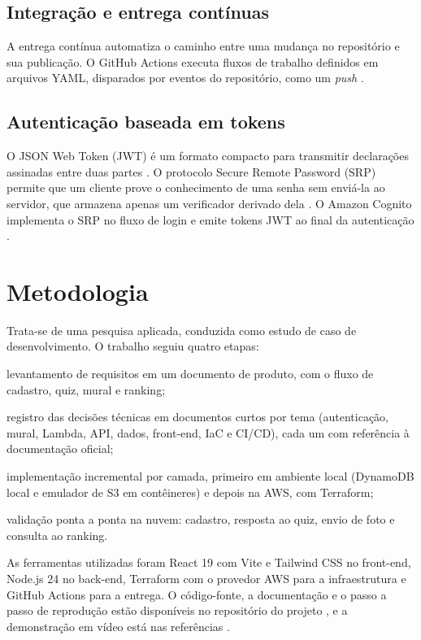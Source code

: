 \documentclass[article, 12pt, oneside, a4paper, english, brazil, sumario=tradicional]{abntex2}
\begin{document}
\subsection{Integração e entrega contínuas}

A entrega contínua automatiza o caminho entre uma mudança no repositório e sua publicação. O GitHub Actions executa fluxos de trabalho definidos em arquivos YAML, disparados por eventos do repositório, como um \textit{push} \cite{ghactions}.

\subsection{Autenticação baseada em tokens}

O JSON Web Token (JWT) é um formato compacto para transmitir declarações assinadas entre duas partes \cite{rfc7519}. O protocolo Secure Remote Password (SRP) permite que um cliente prove o conhecimento de uma senha sem enviá-la ao servidor, que armazena apenas um verificador derivado dela \cite{wu1998}. O Amazon Cognito implementa o SRP no fluxo de login e emite tokens JWT ao final da autenticação \cite{awscognitosrp}.

\section{Metodologia}\label{sec:metodo}

Trata-se de uma pesquisa aplicada, conduzida como estudo de caso de desenvolvimento. O trabalho seguiu quatro etapas:

\begin{alineas}
  \item levantamento de requisitos em um documento de produto, com o fluxo de cadastro, quiz, mural e ranking;
  \item registro das decisões técnicas em documentos curtos por tema (autenticação, mural, Lambda, API, dados, front-end, IaC e CI/CD), cada um com referência à documentação oficial;
  \item implementação incremental por camada, primeiro em ambiente local (DynamoDB local e emulador de S3 em contêineres) e depois na AWS, com Terraform;
  \item validação ponta a ponta na nuvem: cadastro, resposta ao quiz, envio de foto e consulta ao ranking.
\end{alineas}

As ferramentas utilizadas foram React 19 com Vite e Tailwind CSS no front-end, Node.js 24 no back-end, Terraform com o provedor AWS para a infraestrutura e GitHub Actions para a entrega. O código-fonte, a documentação e o passo a passo de reprodução estão disponíveis no repositório do projeto \cite{repositorio}, e a demonstração em vídeo está nas referências \cite{video}.
\end{document}
